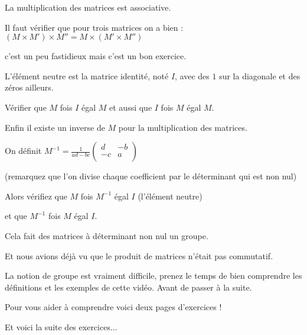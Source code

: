 \change

La multiplication des matrices est associative.

Il faut vérifier que pour trois matrices on a bien : $(M\times M')\times M''=M \times (M'\times M'')$

c'est un peu fastidieux mais c'est un bon exercice.

\change

L'élément neutre est la matrice identité, noté $I$,
avec des $1$ sur la diagonale et des zéros ailleurs.

Vérifier que $M$ fois $I$ égal $M$ et aussi que $I$ fois $M$ égal $M$.

\change


Enfin il existe un inverse de $M$ pour la multiplication des matrices.

On définit $M^{-1} = \frac{1}{ad-bc} \left(\begin{smallmatrix} d & -b \\ -c & a\\ \end{smallmatrix}\right)$

(remarquez que l'on divise chaque coefficient par le déterminant qui est non nul)

Alors vérifiez que  $M$ fois $M^{-1}$ égal $I$ (l'élément neutre)

et que $M^{-1}$ fois $M$ égal $I$.




Cela fait des matrices à déterminant non nul un groupe.

Et nous avions déjà vu que le produit de matrices n'était pas commutatif.

\diapo

La notion de groupe est vraiment difficile, prenez le temps
de bien comprendre les définitions et les exemples de cette vidéo.
Avant de passer à la suite.

Pour vous aider à comprendre voici deux pages d'exercices !



\diapo


Et voici la suite des exercices...


